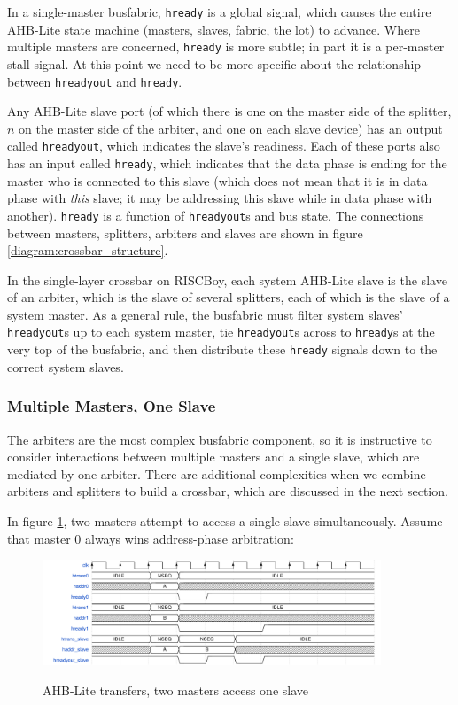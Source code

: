 In a single-master busfabric, {\tt hready} is a global signal, which causes the entire AHB-Lite state machine (masters, slaves, fabric, the lot) to advance. Where multiple masters are concerned, {\tt hready} is more subtle; in part it is a per-master stall signal. At this point we need to be more specific about the relationship between {\tt hreadyout} and {\tt hready}.

Any AHB-Lite slave port (of which there is one on the master side of the splitter, $n$ on the master side of the arbiter, and one on each slave device) has an output called {\tt hreadyout}, which indicates the slave's readiness. Each of these ports also has an input called {\tt hready}, which indicates that the data phase is ending for the master who is connected to this slave (which does not mean that it is in data phase with {\it this} slave; it may be addressing this slave while in data phase with another). {\tt hready} is a function of {\tt hreadyout}s and bus state. The connections between masters, splitters, arbiters and slaves are shown in figure \ref{diagram:crossbar_structure}.

In the single-layer crossbar on RISCBoy, each system AHB-Lite slave is the slave of an arbiter, which is the slave of several splitters, each of which is the slave of a system master. As a general rule, the busfabric must filter system slaves' {\tt hreadyout}s up to each system master, tie {\tt hreadyout}s across to {\tt hready}s at the very top of the busfabric, and then distribute these {\tt hready} signals down to the correct system slaves.

\subsubsection{Multiple Masters, One Slave}

The arbiters are the most complex busfabric component, so it is instructive to consider interactions between multiple masters and a single slave, which are mediated by one arbiter. There are additional complexities when we combine arbiters and splitters to build a crossbar, which are discussed in the next section.

In figure \ref{diagram:ahbl_mm_simult1}, two masters attempt to access a single slave simultaneously. Assume that master 0 always wins address-phase arbitration:

\begin{figure}[H]
\centering
\caption{AHB-Lite transfers, two masters access one slave}
\includegraphics[width=0.9\textwidth]{waves/ahbl_mm_simult1.pdf}
\label{diagram:ahbl_mm_simult1}
\end{figure}

